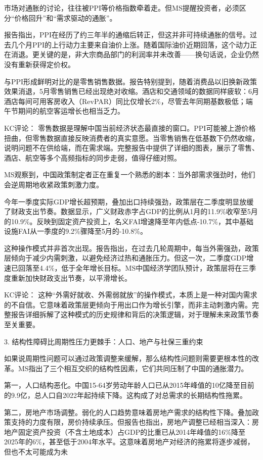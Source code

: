 \documentclass[11pt]{ctexart}
\begin{document}
市场对通胀的讨论，往往被PPI等价格指数牵着走。但MS提醒投资者，必须区分“价格回升”和“需求驱动的通胀”。

报告指出，PPI在经历了约三年半的通缩后转正，但这并非可持续通胀的信号。过去几个月PPI的上行动力主要来自油价上涨。随着国际油价近期回落，这个动力正在消退。更关键的是，非大宗商品部门的利润率并未改善——换句话说，企业仍然没有重新获得定价权。

与PPI形成鲜明对比的是零售销售数据。报告特别提到，随着消费品以旧换新政策效果消退，5月零售销售已经出现绝对收缩。酒店和交通领域的数据同样疲软：6月酒店每间可用客房收入（RevPAR）同比仅增长2\%，尽管去年同期基数极低；端午节期间的航空客运增长也相当乏力。

KC评论： 零售数据是理解中国当前经济状态最直接的窗口。PPI可能被上游价格扭曲，但零售数据直接反映消费者的真实意愿。当零售销售在低基数下仍然收缩，说明问题不在供给端，而在需求端。完整报告中提供了详细的图表，展示了零售、酒店、航空等多个高频指标的同步走弱，值得仔细对照。

MS观察到，中国政策制定者正在重复一个熟悉的剧本：当外部需求强劲时，他们会逆周期地收紧政策刺激力度。

今年一季度实际GDP增长超预期，叠加出口持续强劲，政策层在二季度明显放缓了财政支出节奏。数据显示，广义财政赤字占GDP的比例从1月的11.9\%收窄至5月的10.9\%。反映到固定资产投资上，名义FAI增速降至年内低点-10.7\%，其中基础设施FAI从一季度的9.2\%骤降至5月的-10.8\%。

这种操作模式并非首次出现。报告指出，在过去几轮周期中，每当外需强劲，政策层倾向于减少内需刺激，以避免经济过热和通胀压力。但这一次，二季度GDP增速已回落至4.4\%，低于全年增长目标。MS中国经济学团队预计，政策层将在三季度重新加快财政支出节奏，以平滑增长。

KC评论： 这种“外需好就收、外需弱就放”的操作模式，本质上是一种对国内需求的不自信。它意味着政策层更倾向于用出口作为增长引擎，而非主动刺激内需。完整报告详细拆解了这种模式的历史规律和背后的决策逻辑，对于理解未来政策节奏至关重要。

3. 结构性障碍比周期性压力更棘手：人口、地产与社保三重约束

如果说周期性问题可以通过政策调整来缓解，那么结构性问题则需要更根本性的改革。MS指出了三个相互交织的结构性因素，它们共同压制了中国的通胀潜力。

第一，人口结构恶化。中国15-64岁劳动年龄人口已从2015年峰值的10亿降至目前的9.9亿，总人口自2022年起持续下降。这构成了对总需求的长期结构性拖累。

第二，房地产市场调整。弱化的人口趋势意味着房地产需求的结构性下降。叠加政策支持的力度有限，房价持续承压。但报告也指出，房地产调整已经相当深入：房地产固定资产投资（不含土地成本）占GDP的比重已从2014年峰值的16\%降至2025年的6\%，甚至低于2004年水平。这意味着房地产对经济的拖累将逐步减弱，但也不太可能成为未
\end{document}
